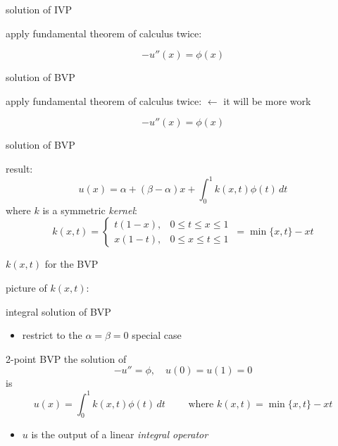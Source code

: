 \documentclass[10pt,
               svgnames,
               hyperref={colorlinks,
                         citecolor=DeepPink4,
                         linkcolor=FireBrick,
                         urlcolor=Maroon},
               usepdftitle=false]{beamer}
\begin{document}
\begin{frame}{solution of IVP}

apply fundamental theorem of calculus twice:

$$-u''(x) = \phi(x)$$

\vspace{70mm}
\end{frame}



\AtBeginSection[] {
    \begin{frame}{Outline}
    \setbeamertemplate{section in toc}[sections numbered]
    \tableofcontents[currentsection]%
    \end{frame}
}


\begin{frame}{solution of BVP}

apply fundamental theorem of calculus twice: \hfill {\footnotesize $\longleftarrow$ it will be more work}

$$-u''(x) = \phi(x)$$

\vspace{70mm}
\end{frame}


\begin{frame}{solution of BVP}

\vspace{50mm}

result:
	$$u(x) = \alpha + (\beta - \alpha) x + \int_0^1 k(x,t) \phi(t)\,dt$$
where $k$ is a symmetric \emph{kernel}:
	$$k(x,t) = \begin{cases} t (1 - x), & 0 \le t \le x \le 1 \\
	                         x (1 - t), & 0 \le x \le t \le 1\end{cases}\, = \min\{x,t\} - xt$$
\end{frame}


\begin{frame}{$k(x,t)$ for the BVP}

picture of $k(x,t)$:

\vspace{70mm}
\end{frame}


\begin{frame}{integral solution of BVP}

\begin{itemize}
\item restrict to the $\alpha=\beta=0$ special case
\end{itemize}

\begin{block}{2-point BVP}
the solution of
    $$-u'' = \phi, \quad u(0) = u(1) = 0$$
is
	$$u(x) = \int_0^1 k(x,t) \phi(t)\,dt \qquad \text{ where } k(x,t) = \min\{x,t\} - xt$$
\end{block}

\begin{itemize}
\item $u$ is the output of a linear \emph{integral operator}
\end{itemize}
\end{frame}
\end{document}
